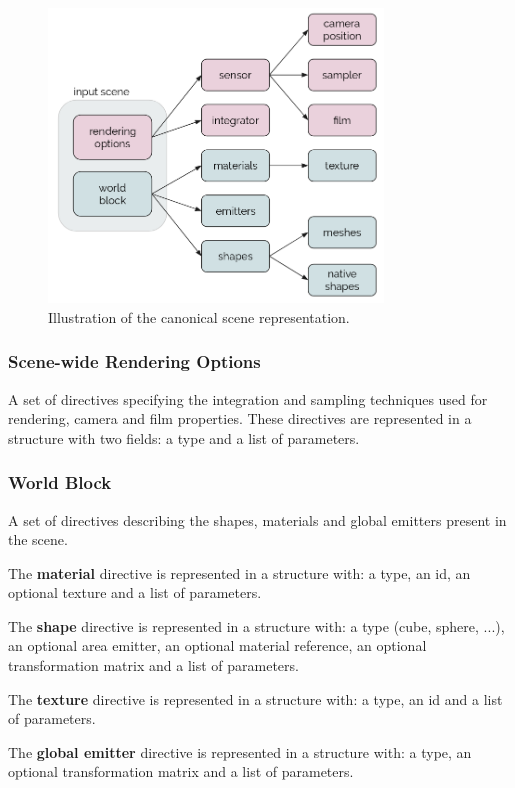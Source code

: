\begin{figure}[h]
\centering
\includegraphics[width=3.5in]{figs/3_system_architecture/canonicalrep.png}
\caption{Illustration of the canonical scene representation.}
\label{fig:canonicalrep}
\end{figure}

\subsubsection{Scene-wide Rendering Options}
A set of directives specifying the integration and sampling techniques used for
rendering, camera and film properties. These directives are represented in a
structure with two fields: a type and a list of parameters.

\subsubsection{World Block}
A set of directives describing the shapes, materials and global emitters present
in the scene.

The \textbf{material} directive is represented in a structure with: a type, an
id, an optional texture and a list of parameters.

The \textbf{shape} directive is represented in a structure with: a type (cube,
sphere, ...), an optional area emitter, an optional material reference, an
optional transformation matrix and a list of parameters.

The \textbf{texture} directive is represented in a structure with: a type, an id and a list of parameters.

The \textbf{global emitter} directive is represented in a structure with: a
type, an optional transformation matrix and a list of parameters.

